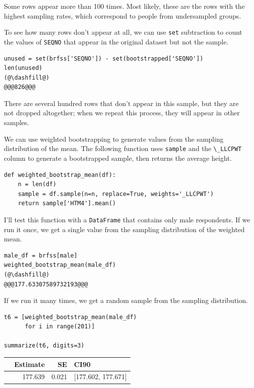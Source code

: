 Some rows appear more than 100 times. Most likely, these are the rows
with the highest sampling rates, which correspond to people from
undersampled groups.

To see how many rows don't appear at all, we can use
\passthrough{\lstinline!set!} subtraction to count the values of
\passthrough{\lstinline!SEQNO!} that appear in the original dataset but
not the sample.

\begin{lstlisting}[]
unused = set(brfss['SEQNO']) - set(bootstrapped['SEQNO'])
len(unused)
(@\dashfill@)
@@@826@@@
\end{lstlisting}

There are several hundred rows that don't appear in this sample, but
they are not dropped altogether; when we repeat this process, they will
appear in other samples.

We can use weighted bootstrapping to generate values from the sampling
distribution of the mean. The following function uses
\passthrough{\lstinline!sample!} and the
\passthrough{\lstinline!\_LLCPWT!} column to generate a bootstrapped
sample, then returns the average height.

\begin{lstlisting}[]
def weighted_bootstrap_mean(df):
    n = len(df)
    sample = df.sample(n=n, replace=True, weights='_LLCPWT')
    return sample['HTM4'].mean()
\end{lstlisting}

I'll test this function with a \passthrough{\lstinline!DataFrame!} that
contains only male respondents. If we run it once, we get a single value
from the sampling distribution of the weighted mean.

\begin{lstlisting}[]
male_df = brfss[male]
weighted_bootstrap_mean(male_df)
(@\dashfill@)
@@@177.63307589732193@@@
\end{lstlisting}

If we run it many times, we get a random sample from the sampling
distribution.

\begin{lstlisting}[]
t6 = [weighted_bootstrap_mean(male_df) 
      for i in range(201)]

summarize(t6, digits=3)
\end{lstlisting}

\begin{tabular}{lrrl}
\midrule
{} &  Estimate &     SE &                CI90 \\
\midrule
{} &   177.639 &  0.021 &  [177.602, 177.671] \\
\midrule
\end{tabular}

